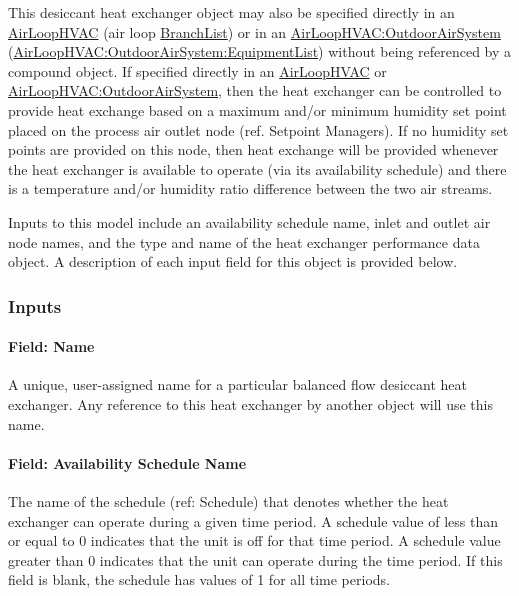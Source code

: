 This desiccant heat exchanger object may also be specified directly in an \hyperref[airloophvac]{AirLoopHVAC} (air loop \hyperref[branchlist]{BranchList}) or in an \hyperref[airloophvacoutdoorairsystem]{AirLoopHVAC:OutdoorAirSystem} (\hyperref[airloophvacoutdoorairsystemequipmentlist]{AirLoopHVAC:OutdoorAirSystem:EquipmentList}) without being referenced by a compound object. If specified directly in an \hyperref[airloophvac]{AirLoopHVAC} or \hyperref[airloophvacoutdoorairsystem]{AirLoopHVAC:OutdoorAirSystem}, then the heat exchanger can be controlled to provide heat exchange based on a maximum and/or minimum humidity set point placed on the process air outlet node (ref. Setpoint Managers). If no humidity set points are provided on this node, then heat exchange will be provided whenever the heat exchanger is available to operate (via its availability schedule) and there is a temperature and/or humidity ratio difference between the two air streams.

Inputs to this model include an availability schedule name, inlet and outlet air node names, and the type and name of the heat exchanger performance data object. A description of each input field for this object is provided below.

\subsubsection{Inputs}\label{inputs-2-018}

\paragraph{Field: Name}\label{field-name-2-017}

A unique, user-assigned name for a particular balanced flow desiccant heat exchanger. Any reference to this heat exchanger by another object will use this name.

\paragraph{Field: Availability Schedule Name}\label{field-availability-schedule-name-2-003}

The name of the schedule (ref: Schedule) that denotes whether the heat exchanger can operate during a given time period. A schedule value of less than or equal to 0 indicates that the unit is off for that time period. A schedule value greater than 0 indicates that the unit can operate during the time period. If this field is blank, the schedule has values of 1 for all time periods.

